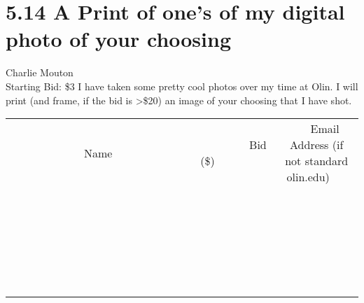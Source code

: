 \documentclass[11pt]{article}
\begin{document}
\section*{5.14 A Print of one's of my digital photo of your choosing}
Charlie Mouton
\\
Starting Bid: \$3
\newline
I have taken some pretty cool photos over my time at Olin. I will print (and frame, if the bid is \textgreater \$20) an image of your choosing that I have shot.
\\[6ex]
\begin{tabular}{c c c}
~~~~~~~~~~~~~Name~~~~~~~~~~~~~ & ~~~~~~~~~Bid (\$)~~~~~~~~~  & ~~~Email Address (if not standard olin.edu)~~~\\
 & & \\
\hline
 & & \\
\hline
 & & \\
\hline
 & & \\
\hline
 & & \\
\hline
 & & \\
\hline
 & & \\
\hline
 & & \\
\hline
 & & \\
\hline
 & & \\
\hline
 & & \\
\hline
 & & \\
\hline
 & & \\
\hline
 & & \\
\hline
 & & \\
\hline
 & & \\
\hline
 & & \\
\hline
 & & \\
\hline
 & & \\
\hline
 & & \\
\hline
 & & \\
\hline
 & & \\
\hline
 & & \\
\hline
 & & \\
\hline
 & & \\
\hline
 & & \\
\hline
\end{tabular}
\newpage
\end{document}
